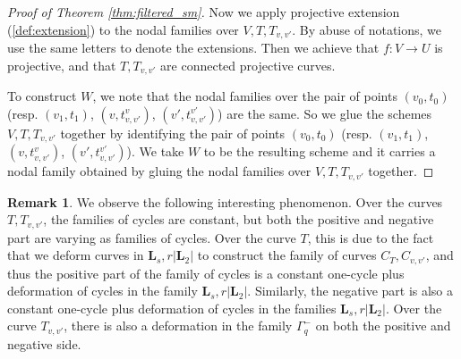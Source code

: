 \documentclass{amsart}
\theoremstyle{definition}
\newtheorem{rem}[theorem]{Remark}
\theoremstyle{remark}
\begin{document}
\begin{proof}[Proof of Theorem \ref{thm:filtered_sm}]
    Now we apply projective extension (\ref{def:extension}) to the nodal families over $V, T, T_{v, v'}$. By abuse of notations, we use the same letters to denote the extensions.
    Then we achieve that $f: V \to U$ is projective, and that $T, T_{v, v'}$ are connected projective curves.
    
    To construct $W$, we note that the nodal families over the pair of points $(v_0, t_0)$ (resp. $(v_1, t_1)$, $(v, t_{v, v'}^v)$, $(v', t_{v, v'}^{v'})$) are the same. 
    So we glue the schemes $V, T, T_{v, v'}$ together by identifying the pair of points $(v_0, t_0)$ (resp. $(v_1, t_1)$, $(v, t_{v, v'}^v)$, $(v', t_{v, v'}^{v'})$).
    We take $W$ to be the resulting scheme and it carries a nodal family obtained by gluing the nodal families over $V, T, T_{v, v'}$ together.
\end{proof}

\begin{rem}
    We observe the following interesting phenomenon.
    Over the curves $T, T_{v, v'}$, the families of cycles are constant, but both the positive and negative part are varying as families of cycles.
    Over the curve $T$, this is due to the fact that we deform curves in $\mathbf{L}_s, r|\mathbf{L}_2|$ to construct the family of curves $C_T, C_{v, v'}$, and thus the positive part of the family of cycles is a constant one-cycle plus deformation of cycles in the family $\mathbf{L}_{s}, r|\mathbf{L}_2|$. Similarly, the negative part is also a constant one-cycle plus deformation of cycles in the families $\mathbf{L}_{s}, r|\mathbf{L}_2|$.
    Over the curve $T_{v, v'}$, there is also a deformation in the family $\Gamma_q^-$ on both the positive and negative side.
\end{rem}
\end{document}
